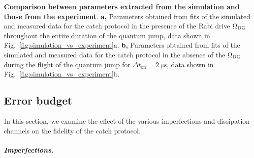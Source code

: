 \begin{table}
\caption[Comparison between parameters extracted from the simulation and those
from the experiment. ]{\label{tab:Comparison-of-parameters} \textbf{Comparison between
parameters extracted from the simulation and those from the experiment}.
\textbf{a,} Parameters obtained from fits of the simulated and measured
data for the catch protocol in the presence of the Rabi drive $\Omega_{{\rm DG}}$
throughout the entire duration of the quantum jump, data shown in
Fig.~\ref{fig:simulation_vs_experiment}a. \textbf{b,} Parameters
obtained from fits of the simulated and measured data for the catch
protocol in the absence of the $\Omega_{{\rm DG}}$ during the flight
of the quantum jump for $\Delta t_{\mathrm{on}}=2\mathrm{\ \mu s}$,
data shown in Fig.~\ref{fig:simulation_vs_experiment}b. }
\end{table}

\clearpage{}

\subsection{Error budget\label{sec:Budget-coherence}}

In this section, we examine the effect of the various imperfections
and dissipation channels on the fidelity of the catch protocol. 

\paragraph{\textit{\emph{Imperfections.}}}

